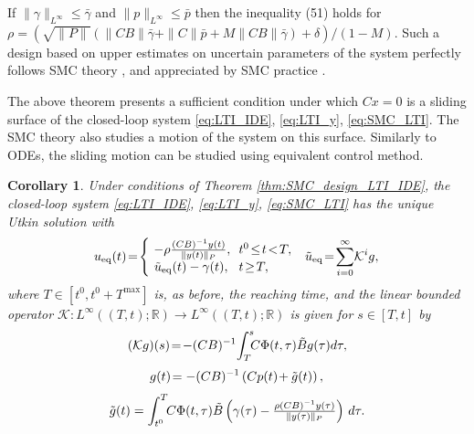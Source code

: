 \documentclass{article}
\newcommand{\R}{\mathbb{R}}
\newtheorem{corollary}{Corollary}
\begin{document}
If $\|\gamma\|_{L^{\infty}}\leq \bar \gamma$ and $\|p\|_{L^\infty}\leq \bar p$ then the inequality (51) holds for $\rho =(\sqrt{\|P\|}(\|CB\|\bar\gamma +\|C\|\bar p+M\|CB\|\bar \gamma)+\delta)/(1-M)$. Such a design based on upper estimates on uncertain parameters of the system perfectly follows SMC theory \cite{Utkin1992:Book}, \cite{EdwardsSpurgeon1998:Book} and appreciated by SMC practice \cite{Utkin_etal2009:Book}.

The above theorem presents a sufficient condition under which  $Cx=0$ is a sliding surface of the closed-loop system \eqref{eq:LTI_IDE}, \eqref{eq:LTI_y}, \eqref{eq:SMC_LTI}.  
The SMC  theory \cite{Utkin1992:Book} also studies a motion of the system on this surface. 
Similarly to  ODEs, the sliding motion can be studied using  equivalent control method. 


\begin{corollary}\label{cor:Utkin_sol_LTI_SMC}
	\itshape
	Under conditions of Theorem \ref{thm:SMC_design_LTI_IDE}, the closed-loop system 
	\eqref{eq:LTI_IDE}, \eqref{eq:LTI_y}, \eqref{eq:SMC_LTI} has the unique Utkin solution with\vspace{-1mm}
	\begin{equation} \label{eq:LTI_IDE_u_eq}
		u_{\rm eq}(t)\!=\!\left\{
		\begin{array}{cl}
			\!-\rho\frac{(CB)^{-1}y(t)}{\|y(t)\|_{P}}, & \!\!t^0\!\leq\! t\!<\!T,\\
			\!\!\tilde u_{\rm eq}(t)-\gamma(t), &  \!\!t\!\geq \! T,
		\end{array}
		\right.  \;\tilde u_{\rm eq}\!=\!\sum_{i=0}^{\infty} \!\mathcal{K}^ig,\,
		\vspace{-1mm}
	\end{equation}
	where $T\in [t^0,t^0+T^{\max}]$ is, as before, the reaching time, and  the linear bounded operator  $\mathcal{K}: L^{\infty}((T,t);\R)\to L^{\infty}((T,t);\R)$ is given for $s\in[T,t]$ by\vspace{-1mm}
	\begin{equation}\label{eq:K_operator}	
		(\mathcal{K}g)(s)\!=\!-(CB)^{-1}\!\int^{s}_{T}\!\!\!C\Phi(t,\tau)\tilde B g(\tau)d\tau,  
		\vspace{-1mm}
	\end{equation}
	\begin{equation}
		\!g(t)\!=-(CB)^{-1}\left(Cp(t)\!+\tilde g(t)\right),\vspace{-1mm}
	\end{equation}
\begin{equation}
		\tilde g(t)=
		\int^{T}_{t^0}\!\!C\Phi(t,\tau)\tilde B\left(\gamma(\tau)-\tfrac{\rho (CB)^{-1}y(\tau)}{\|y(\tau)\|_{P}}\right)\,d\tau.\vspace{-1mm}

\end{equation}
\end{corollary}
\end{document}
